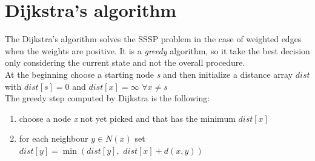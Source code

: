 \documentclass[10pt,a4paper]{book}
\begin{document}
	 \chapter{Dijkstra's algorithm}
	 The Dijkstra's algorithm solves the SSSP problem in the case of weighted edges when the weights are positive. It is a \textit{greedy} algorithm, so it take the best decision only considering the current state and not the overall procedure.\\
	 At the beginning choose a starting node \textit{s} and then initialize a distance array $ dist $ with $ dist[s] = 0 $ and $ dist[x]  = \infty \,\, \forall x \neq s $ \\
	 The greedy step computed by Dijkstra is the following:
	 \begin{enumerate}
		 	\item choose a node \textit{x} not yet picked and that has the minimum $ dist[x] $
		 	\item for each neighbour $ y \in N(x) $ set $ dist[y] = \min(dist[y], \,\,dist[x] + d(x,y)) $
	 \end{enumerate}
\end{document}
